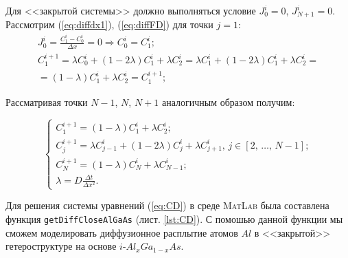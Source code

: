Для <<закрытой системы>> должно выполняться условие $J_{0}^{i} = 0$, $J_{N+1}^{i} = 0$. Рассмотрим (\ref{eq:diffdx1}), (\ref{eq:diffFD}) для точки $j = 1$:
\begin{gather*}
 	J^{i}_{0} = \frac{C^{i}_{1} - C^{i}_{0}}{\Delta x} = 0 \Rightarrow C_{0}^{i} = C_{1}^{i};\\
	C^{i+1}_{1} = \lambda C^{i}_{0} + (1 - 2\lambda)C^{i}_{1} + \lambda C^{i}_{2} = \lambda C^{i}_{1} + (1 - 2\lambda)C^{i}_{1} + \lambda C^{i}_{2} = \\
	= (1 - \lambda)C^{i}_{1} + \lambda C^{i}_{2} = C^{i+1}_{1};
\end{gather*}

Рассматривая точки $N-1$, $N$, $N+1$ аналогичным образом получим:

\begin{equation}
	\label{eq:CD}
	\begin{cases}
		C^{i+1}_{1} = (1 - \lambda)C^{i}_{1} + \lambda C^{i}_{2};\\
		C^{i+1}_{j} = \lambda C^{i}_{j-1} + (1 - 2\lambda)C^{i}_{j} + \lambda C^{i}_{j+1},\,j \in [2,\,\dots,\,N-1];\\
		C^{i+1}_{N} = (1 - \lambda)C^{i}_{N} + \lambda C^{i}_{N-1};\\
		\lambda = D\frac{\Delta t}{\Delta x^{2}}.
	\end{cases}
\end{equation}

Для решения системы уравнений (\ref{eq:CD}) в среде \textsc{MatLab} была составлена функция \texttt{getDiffCloseAlGaAs} (лист. \ref{lst:CD}). С помошью данной функции мы сможем моделировать диффузионное расплытие атомов $Al$ в <<закрытой>> гетероструктуре на основе $i$-$Al_{x}Ga_{1-x}As$.

